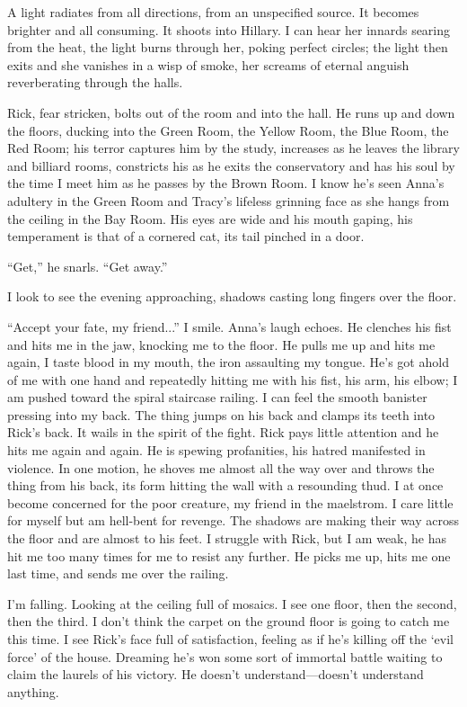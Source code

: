 \documentclass[
]{article}
\begin{document}
A light radiates from all directions, from an unspecified source. It
becomes brighter and all consuming. It shoots into Hillary. I can hear
her innards searing from the heat, the light burns through her, poking
perfect circles; the light then exits and she vanishes in a wisp of
smoke, her screams of eternal anguish reverberating through the halls.

Rick, fear stricken, bolts out of the room and into the hall. He runs up
and down the floors, ducking into the Green Room, the Yellow Room, the
Blue Room, the Red Room; his terror captures him by the study, increases
as he leaves the library and billiard rooms, constricts his as he exits
the conservatory and has his soul by the time I meet him as he passes by
the Brown Room. I know he's seen Anna's adultery in the Green Room and
Tracy's lifeless grinning face as she hangs from the ceiling in the Bay
Room. His eyes are wide and his mouth gaping, his temperament is that of
a cornered cat, its tail pinched in a door.

``Get,'' he snarls. ``Get away.''

I look to see the evening approaching, shadows casting long fingers over
the floor.

``Accept your fate, my friend...'' I smile. Anna's laugh echoes. He
clenches his fist and hits me in the jaw, knocking me to the floor. He
pulls me up and hits me again, I taste blood in my mouth, the iron
assaulting my tongue. He's got ahold of me with one hand and repeatedly
hitting me with his fist, his arm, his elbow; I am pushed toward the
spiral staircase railing. I can feel the smooth banister pressing into
my back. The thing jumps on his back and clamps its teeth into Rick's
back. It wails in the spirit of the fight. Rick pays little attention
and he hits me again and again. He is spewing profanities, his hatred
manifested in violence. In one motion, he shoves me almost all the way
over and throws the thing from his back, its form hitting the wall with
a resounding thud. I at once become concerned for the poor creature, my
friend in the maelstrom. I care little for myself but am hell-bent for
revenge. The shadows are making their way across the floor and are
almost to his feet. I struggle with Rick, but I am weak, he has hit me
too many times for me to resist any further. He picks me up, hits me one
last time, and sends me over the railing.

I'm falling. Looking at the ceiling full of mosaics. I see one floor,
then the second, then the third. I don't think the carpet on the ground
floor is going to catch me this time. I see Rick's face full of
satisfaction, feeling as if he's killing off the `evil force' of the
house. Dreaming he's won some sort of immortal battle waiting to claim
the laurels of his victory. He doesn't understand---doesn't understand
anything.
\end{document}
